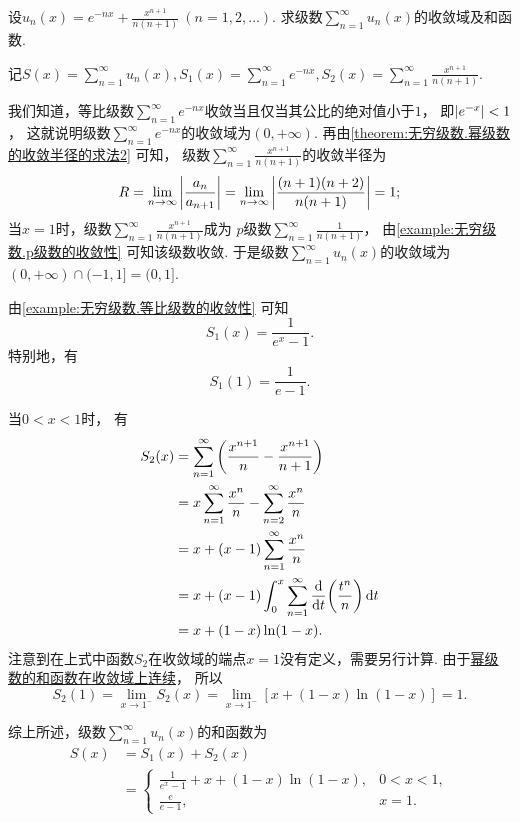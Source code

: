 \begin{example}
设\(u_n(x) = e^{-nx} + \frac{x^{n+1}}{n(n+1)}\ (n=1,2,\dotsc)\).
求级数\(\sum_{n=1}^\infty u_n(x)\)的收敛域及和函数.
\begin{solution}
记\(S(x) = \sum_{n=1}^\infty u_n(x),
S_1(x) = \sum_{n=1}^\infty e^{-nx},
S_2(x) = \sum_{n=1}^\infty \frac{x^{n+1}}{n(n+1)}\).

我们知道，等比级数\(\sum_{n=1}^\infty e^{-nx}\)收敛当且仅当其公比的绝对值小于\(1\)，
即\(\abs{e^{-x}} < 1\)，
这就说明级数\(\sum_{n=1}^\infty e^{-nx}\)的收敛域为\((0,+\infty)\).
再由\cref{theorem:无穷级数.幂级数的收敛半径的求法2} 可知，
级数\(\sum_{n=1}^\infty \frac{x^{n+1}}{n(n+1)}\)的收敛半径为\begin{equation*}
	R = \lim_{n\to\infty} \abs{\frac{a_n}{a_{n+1}}}
	= \lim_{n\to\infty} \abs{\frac{(n+1)(n+2)}{n(n+1)}}
	= 1;
\end{equation*}
当\(x=1\)时，级数\(\sum_{n=1}^\infty \frac{x^{n+1}}{n(n+1)}\)成为
\(p\)级数\(\sum_{n=1}^\infty \frac1{n(n+1)}\)，
由\cref{example:无穷级数.p级数的收敛性} 可知该级数收敛.
于是级数\(\sum_{n=1}^\infty u_n(x)\)的收敛域为
\((0,+\infty) \cap (-1,1] = (0,1]\).

由\cref{example:无穷级数.等比级数的收敛性} 可知\begin{equation*}
	S_1(x) = \frac1{e^x-1}.
\end{equation*}
特别地，有\begin{equation*}
	S_1(1) = \frac1{e-1}.
\end{equation*}

当\(0<x<1\)时，
有\begin{align*}
	S_2(x) &= \sum_{n=1}^\infty \left( \frac{x^{n+1}}{n} - \frac{x^{n+1}}{n+1} \right) \\
	&= x \sum_{n=1}^\infty \frac{x^n}{n} - \sum_{n=2}^\infty \frac{x^n}{n} \\
	&= x + (x-1) \sum_{n=1}^\infty \frac{x^n}{n} \\
	&= x + (x-1) \int_0^x \sum_{n=1}^\infty \dv{t}(\frac{t^n}{n}) \dd{t} \\
	&= x + (1-x) \ln(1-x).
\end{align*}
注意到在上式中函数\(S_2\)在收敛域的端点\(x=1\)没有定义，需要另行计算.
由于\hyperref[theorem:无穷级数.幂级数的和函数的性质1]{幂级数的和函数在收敛域上连续}，
所以\begin{equation*}
	S_2(1) = \lim_{x\to1^-} S_2(x)
	= \lim_{x\to1^-} [x + (1-x) \ln(1-x)]
	= 1.
\end{equation*}

综上所述，级数\(\sum_{n=1}^\infty u_n(x)\)的和函数为\begin{align*}
	S(x)
	&= S_1(x) + S_2(x) \\
	&= \left\{ \begin{array}{cl}
		\frac1{e^x-1} + x + (1-x) \ln(1-x),
			& 0<x<1, \\
		\frac{e}{e-1},
			& x=1.
	\end{array} \right.
\end{align*}
\end{solution}
\end{example}

